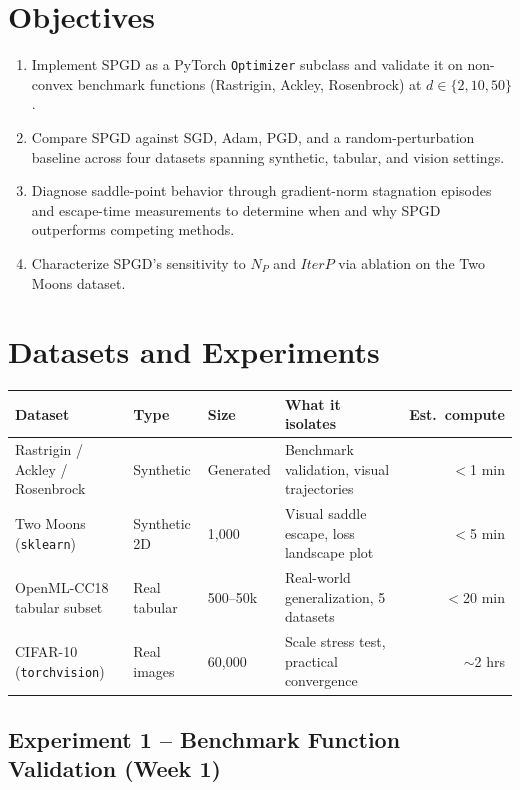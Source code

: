 \documentclass[11pt]{article}
\begin{document}
\section{Objectives}

\begin{enumerate}[leftmargin=*, itemsep=2pt, topsep=2pt]
    \item Implement SPGD as a PyTorch \texttt{Optimizer} subclass and validate it on non-convex benchmark functions (Rastrigin, Ackley, Rosenbrock) at $d \in \{2, 10, 50\}$.
    \item Compare SPGD against SGD, Adam, PGD, and a random-perturbation baseline across four datasets spanning synthetic, tabular, and vision settings.
    \item Diagnose saddle-point behavior through gradient-norm stagnation episodes and escape-time measurements to determine when and why SPGD outperforms competing methods.
    \item Characterize SPGD's sensitivity to $N_P$ and $\textit{IterP}$ via ablation on the Two Moons dataset.
\end{enumerate}

\section{Datasets and Experiments}

\begin{table}[h]
\centering
\small
\begin{tabular}{@{}llllr@{}}
\toprule
\textbf{Dataset} & \textbf{Type} & \textbf{Size} & \textbf{What it isolates} & \textbf{Est.\ compute} \\
\midrule
Rastrigin / Ackley / Rosenbrock & Synthetic & Generated & Benchmark validation, visual trajectories & $<$1 min \\
Two Moons (\texttt{sklearn}) & Synthetic 2D & 1{,}000 & Visual saddle escape, loss landscape plot & $<$5 min \\
OpenML-CC18 tabular subset & Real tabular & 500--50k & Real-world generalization, 5 datasets & $<$20 min \\
CIFAR-10 (\texttt{torchvision}) & Real images & 60{,}000 & Scale stress test, practical convergence & $\sim$2 hrs \\
\bottomrule
\end{tabular}
\end{table}

\subsection*{Experiment 1 -- Benchmark Function Validation (Week 1)}
\end{document}
